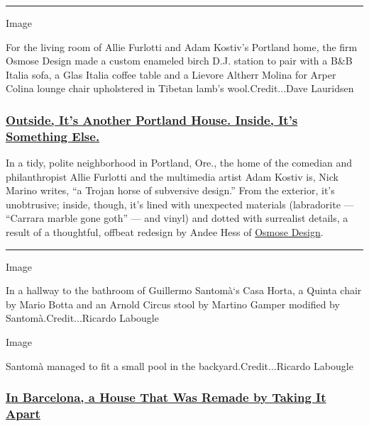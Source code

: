 \begin{center}\rule{0.5\linewidth}{\linethickness}\end{center}

Image

For the living room of Allie Furlotti and Adam Kostiv's Portland home,
the firm Osmose Design made a custom enameled birch D.J. station to pair
with a B\&B Italia sofa, a Glas Italia coffee table and a Lievore
Altherr Molina for Arper Colina lounge chair upholstered in Tibetan
lamb's wool.Credit...Dave Lauridsen

\hypertarget{outside-its-another-portland-house-inside-its-something-else}{%
\subsubsection{\texorpdfstring{\textbf{\href{https://www.nytimes3xbfgragh.onion/2019/11/05/t-magazine/portland-house-allie-furlotti-osmose-design.html}{Outside,
It's Another Portland House. Inside, It's Something
Else.}}}{Outside, It's Another Portland House. Inside, It's Something Else.}}\label{outside-its-another-portland-house-inside-its-something-else}}

In a tidy, polite neighborhood in Portland, Ore., the home of the
comedian and philanthropist Allie Furlotti and the multimedia artist
Adam Kostiv is, Nick Marino writes, ``a Trojan horse of subversive
design.'' From the exterior, it's unobtrusive; inside, though, it's
lined with unexpected materials (labradorite --- ``Carrara marble gone
goth'' --- and vinyl) and dotted with surrealist details, a result of a
thoughtful, offbeat redesign by Andee Hess of
\href{http://www.osmosedesign.com/}{Osmose Design}.

\begin{center}\rule{0.5\linewidth}{\linethickness}\end{center}

Image

In a hallway to the bathroom of Guillermo Santomà`s Casa Horta, a Quinta
chair by Mario Botta and an Arnold Circus stool by Martino Gamper
modified by Santomà.Credit...Ricardo Labougle

Image

Santomà managed to fit a small pool in the backyard.Credit...Ricardo
Labougle

\hypertarget{in-barcelona-a-house-that-was-remade-by-taking-it-apart}{%
\subsubsection{\texorpdfstring{\textbf{\href{https://www.nytimes3xbfgragh.onion/2018/08/27/t-magazine/architect-guillermo-santoma-casa-horta-barcelona.html}{In
Barcelona, a House That Was Remade by Taking It
Apart}}}{In Barcelona, a House That Was Remade by Taking It Apart}}\label{in-barcelona-a-house-that-was-remade-by-taking-it-apart}}

